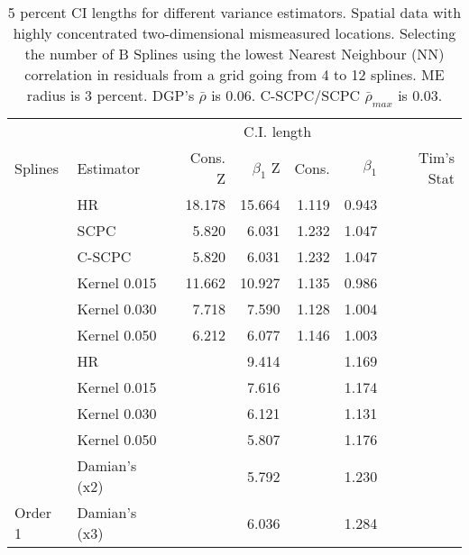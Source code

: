\documentclass[
]{article}
\begin{document}
\hypertarget{tbl-lights-me-true-rho-above}{}
\begin{longtable}[t]{llrrrrr}
\caption{\label{tbl-lights-me-true-rho-above}5 percent CI lengths for different variance estimators. Spatial data
with highly concentrated two-dimensional mismeasured locations.
Selecting the number of B Splines using the lowest Nearest Neighbour
(NN) correlation in residuals from a grid going from 4 to 12 splines. ME
radius is 3 percent. DGP's \(\bar\rho\) is 0.06. C-SCPC/SCPC
\(\bar\rho_{max}\) is 0.03. }\tabularnewline

\toprule
\multicolumn{2}{c}{ } & \multicolumn{4}{c}{C.I. length} \\
\cmidrule(l{3pt}r{3pt}){3-6}
Splines & Estimator & Cons. Z & $\beta_1$ Z & Cons. & $\beta_1$ & Tim's Stat\\
\midrule
 & HR & 18.178 & 15.664 & 1.119 & 0.943 & \\

 & SCPC & 5.820 & 6.031 & 1.232 & 1.047 & \\

 & C-SCPC & 5.820 & 6.031 & 1.232 & 1.047 & \\

 & Kernel 0.015 & 11.662 & 10.927 & 1.135 & 0.986 & \\

 & Kernel 0.030 & 7.718 & 7.590 & 1.128 & 1.004 & \\

\multirow[t]{-6}{*}{\raggedright\arraybackslash } & Kernel 0.050 & 6.212 & 6.077 & 1.146 & 1.003 & \multirow[t]{-6}{*}{\raggedleft\arraybackslash 133.375}\\
\cmidrule{1-7}
 & HR &  & 9.414 &  & 1.169 & \\

 & Kernel 0.015 &  & 7.616 &  & 1.174 & \\

 & Kernel 0.030 &  & 6.121 &  & 1.131 & \\

 & Kernel 0.050 &  & 5.807 &  & 1.176 & \\

 & Damian's (x2) &  & 5.792 &  & 1.230 & \\

\multirow[t]{-6}{*}{\raggedright\arraybackslash Order 1} & Damian's (x3) &  & 6.036 &  & 1.284 & \multirow[t]{-6}{*}{\raggedleft\arraybackslash 10.719}\\
\bottomrule
\end{longtable}
\end{document}
